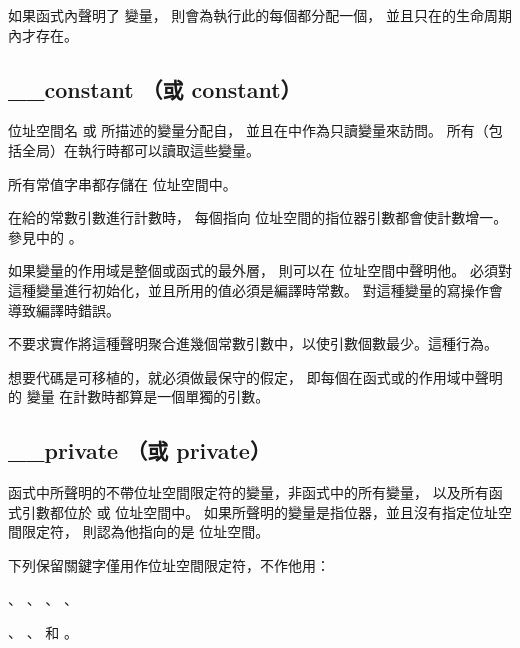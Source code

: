 \startnotepar
如果函式內聲明了  變量，
則會為執行此的每個都分配一個，
並且只在的生命周期內才存在。
\stopnotepar

\subsection{__constant （或 constant）}

位址空間名  或  所描述的變量分配自，
並且在中作為只讀變量來訪問。
所有（包括全局）在執行時都可以讀取這些變量。

所有常值字串都存儲在  位址空間中。

\startnotepar
在給的常數引數進行計數時，
每個指向  位址空間的指位器引數都會使計數增一。
參見中的 。
\stopnotepar

如果變量的作用域是整個或函式的最外層，
則可以在  位址空間中聲明他。
必須對這種變量進行初始化，並且所用的值必須是編譯時常數。
對這種變量的寫操作會導致編譯時錯誤。

不要求實作將這種聲明聚合進幾個常數引數中，以使引數個數最少。這種行為。

想要代碼是可移植的，就必須做最保守的假定，
即每個在函式或的作用域中聲明的  變量
在計數時都算是一個單獨的引數。

\subsection{__private （或 private）}

函式中所聲明的不帶位址空間限定符的變量，非函式中的所有變量，
以及所有函式引數都位於  或  位址空間中。
如果所聲明的變量是指位器，並且沒有指定位址空間限定符，
則認為他指向的是  位址空間。

下列保留關鍵字僅用作位址空間限定符，不作他用：
\startigBase
\item {}、 、 、 、
\item {}、 、  和 。
\stopigBase
